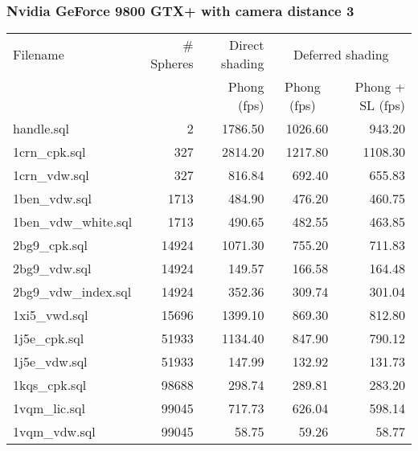 \subsubsection*{Nvidia GeForce 9800 GTX+ with camera distance 3}
\begin{tabular}{|l|r|r|r|r|}
\hline
Filename & \# Spheres & Direct shading & \multicolumn{2}{|c|}{Deferred shading} \\
         &            & Phong (fps)    & \multicolumn{1}{|c}{Phong (fps)} & Phong + SL (fps) \\  
\hline
\hline
handle.sql & 2 & 1786.50 & 1026.60 & 943.20 \\
\hline
1crn\_cpk.sql & 327 & 2814.20 & 1217.80 & 1108.30 \\
\hline
1crn\_vdw.sql & 327 & 816.84 & 692.40 & 655.83 \\
\hline
1ben\_vdw.sql & 1713 & 484.90 & 476.20 & 460.75 \\
\hline
1ben\_vdw\_white.sql & 1713 & 490.65 & 482.55 & 463.85 \\
\hline
2bg9\_cpk.sql & 14924 & 1071.30 & 755.20 & 711.83 \\
\hline
2bg9\_vdw.sql & 14924 & 149.57 & 166.58 & 164.48 \\
\hline
2bg9\_vdw\_index.sql & 14924 & 352.36 & 309.74 & 301.04 \\
\hline
1xi5\_vwd.sql & 15696 & 1399.10 & 869.30 & 812.80 \\
\hline
1j5e\_cpk.sql & 51933 & 1134.40 & 847.90 & 790.12 \\
\hline
1j5e\_vdw.sql & 51933 & 147.99 & 132.92 & 131.73 \\
\hline
1kqs\_cpk.sql & 98688 & 298.74 & 289.81 & 283.20 \\
\hline
1vqm\_lic.sql & 99045 & 717.73 & 626.04 & 598.14 \\
\hline
1vqm\_vdw.sql & 99045 & 58.75 & 59.26 & 58.77 \\
\hline
\end{tabular}
